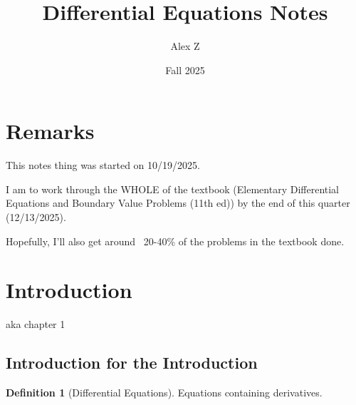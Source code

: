 \documentclass{article}
\title{Differential Equations Notes}
\author{Alex Z}
\date{Fall 2025}
\theoremstyle{definition}
\newtheorem*{definition}{Definition}
\begin{document}
\maketitle
\newpage

\tableofcontents
\newpage


\section*{Remarks}

This notes thing was started on 10/19/2025.

I am to work through the WHOLE of the textbook (Elementary Differential Equations and Boundary Value Problems (11th ed)) by the end of this quarter (12/13/2025).

Hopefully, I'll also get around ~20-40\% of the problems in the textbook done.

\newpage

\section{Introduction}

aka chapter 1

\subsection{Introduction for the Introduction}

\begin{definition}[Differential Equations]
    Equations containing derivatives.
\end{definition}
\end{document}
